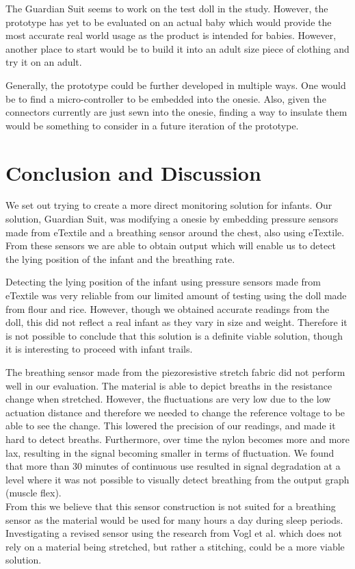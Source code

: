 \documentclass{sigchi-ext}
\begin{document}
The Guardian Suit seems to work on the test doll in the study. However,
the prototype has yet to be evaluated on an actual baby which would provide the
most accurate real world usage as the product is intended for babies. However,
another place to start would be to build it into an adult size piece of clothing
and try it on an adult.

Generally, the prototype could be further developed in multiple ways. One would be to 
find a micro-controller to be embedded into the onesie. Also, given the connectors currently are just
sewn into the onesie, finding a way to insulate them would be something to consider in a future
iteration of the prototype.

\section{Conclusion and Discussion}
We set out trying to create a more direct monitoring solution for infants. Our solution, Guardian Suit, was 
modifying a onesie by embedding pressure sensors made from eTextile and a breathing sensor around the
chest, also using eTextile. From these sensors we are able to obtain output which will enable us to 
detect the lying position of the infant and the breathing rate.

Detecting the lying position of the infant using pressure sensors made from eTextile was very reliable from our limited amount of 
testing using the doll made from flour and rice. However, though we obtained accurate readings from the doll, this did not 
reflect a real infant as they vary in size and weight. Therefore it is not possible to conclude that this solution is a definite viable
solution, though it is interesting to proceed with infant trails.

The breathing sensor made from the piezoresistive stretch fabric did not perform well in our evaluation. The material
is able to depict breaths in the resistance change when stretched. However, the fluctuations are very low due to the 
low actuation distance and therefore we needed to change the reference voltage to be able to see the change. This lowered the precision of our readings, and made it hard to detect breaths. Furthermore, 
over time the nylon becomes more and more lax, resulting in the signal becoming smaller in terms of fluctuation. We found that more than 30 minutes of continuous use resulted in signal
degradation at a level where it was not possible to visually detect breathing from the output graph (muscle flex).\\
From this we believe that this sensor construction is not suited for a breathing sensor as the material would be
used for many hours a day during sleep periods. Investigating a revised sensor using the research from Vogl et al. \cite{stretcheband}
which does not rely on a material being stretched, but rather a stitching, could be a more viable solution.
\end{document}
